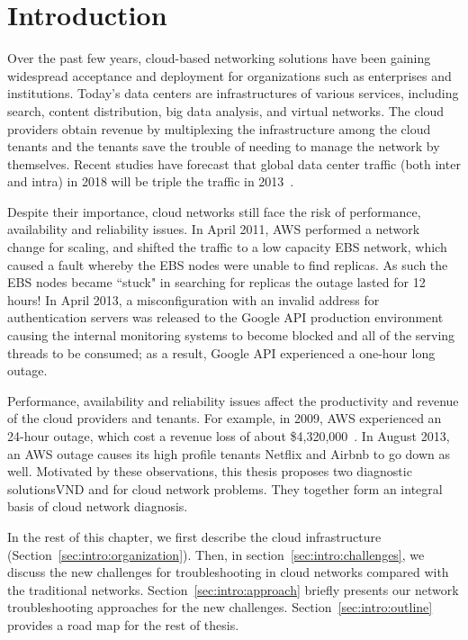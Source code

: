 \chapter{Introduction}
\label{chap:intro}
Over the past few years, cloud-based networking solutions have been gaining widespread acceptance and
deployment for organizations such as enterprises and institutions. 
Today's data centers are infrastructures of various services, including search, content distribution,
big data analysis, and virtual networks. The cloud providers obtain revenue by multiplexing the 
infrastructure among the cloud tenants and the tenants save the trouble of needing to manage the network by themselves.
Recent studies have forecast that global data center traffic (both inter and intra) in 2018 will 
be triple the traffic in 2013~\cite{cisco2018}.

Despite their importance, cloud networks still face the risk of performance, availability and
reliability issues. In April 2011, AWS performed a network change for scaling, 
and shifted the traffic to a low capacity EBS network, which caused a fault whereby the EBS nodes
were unable to find replicas. As such the EBS nodes became ``stuck" in searching 
for replicas \textemdash  the outage lasted for 12 hours!
In April 2013, a misconfiguration with an invalid address for authentication
servers was released to the Google API production environment causing the internal monitoring systems
to become blocked and all of the serving threads to be consumed; as a result, Google API experienced 
a one-hour long outage.

Performance, availability and reliability issues affect the productivity and revenue of the cloud 
providers and tenants. For example, in 2009, AWS experienced an 24-hour outage, which cost a revenue loss of 
about \$4,320,000~\cite{clouddowntime}.
In August 2013, an AWS outage causes its high profile tenants Netflix and 
Airbnb to go down as well.
Motivated by these observations, this thesis proposes two diagnostic solutions\textemdash VND and \Name\textemdash
for cloud network problems. They together form an integral basis of cloud network diagnosis.

In the rest of this chapter, we first describe the cloud infrastructure (Section~\ref{sec:intro:organization}).
Then, in section~\ref{sec:intro:challenges}, we discuss the new challenges for troubleshooting 
in cloud networks compared with the traditional networks. 
Section~\ref{sec:intro:approach} briefly presents our network troubleshooting approaches 
for the new challenges. 
Section~\ref{sec:intro:outline} provides a road map for the rest of thesis.

